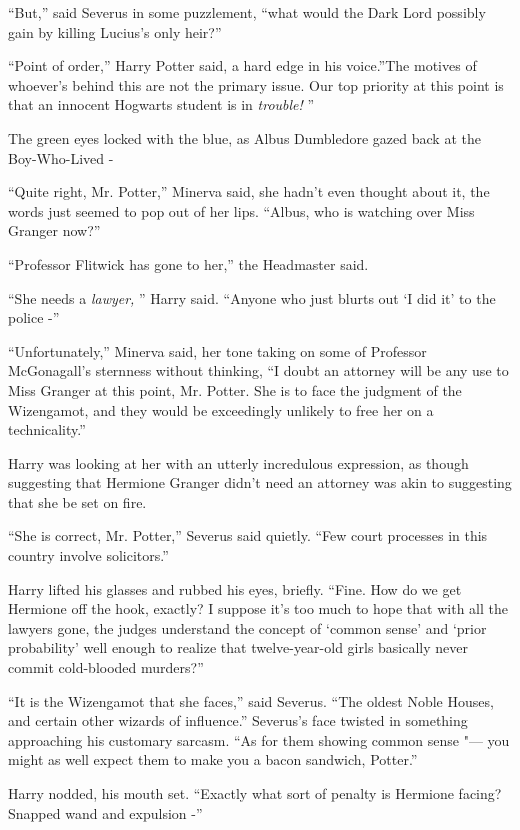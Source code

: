 ``But,'' said Severus in some puzzlement, ``what would the Dark Lord
possibly gain by killing Lucius's only heir?''

``Point of order,'' Harry Potter said, a hard edge in his voice.''The
motives of whoever's behind this are not the primary issue. Our top
priority at this point is that an innocent Hogwarts student is in
\emph{trouble!} ''

The green eyes locked with the blue, as Albus Dumbledore gazed back at
the Boy-Who-Lived -

``Quite right, Mr. Potter,'' Minerva said, she hadn't even thought about
it, the words just seemed to pop out of her lips. ``Albus, who is
watching over Miss Granger now?''

``Professor Flitwick has gone to her,'' the Headmaster said.

``She needs a \emph{lawyer,} '' Harry said. ``Anyone who just blurts out
`I did it' to the police -''

``Unfortunately,'' Minerva said, her tone taking on some of Professor
McGonagall's sternness without thinking, ``I doubt an attorney will be
any use to Miss Granger at this point, Mr. Potter. She is to face the
judgment of the Wizengamot, and they would be exceedingly unlikely to
free her on a technicality.''

Harry was looking at her with an utterly incredulous expression, as
though suggesting that Hermione Granger didn't need an attorney was akin
to suggesting that she be set on fire.

``She is correct, Mr. Potter,'' Severus said quietly. ``Few court
processes in this country involve solicitors.''

Harry lifted his glasses and rubbed his eyes, briefly. ``Fine. How do we
get Hermione off the hook, exactly? I suppose it's too much to hope that
with all the lawyers gone, the judges understand the concept of `common
sense' and `prior probability' well enough to realize that
twelve-year-old girls basically never commit cold-blooded murders?''

``It is the Wizengamot that she faces,'' said Severus. ``The oldest
Noble Houses, and certain other wizards of influence.'' Severus's face
twisted in something approaching his customary sarcasm. ``As for them
showing common sense "--- you might as well expect them to make you a bacon
sandwich, Potter.''

Harry nodded, his mouth set. ``Exactly what sort of penalty is Hermione
facing? Snapped wand and expulsion -''

